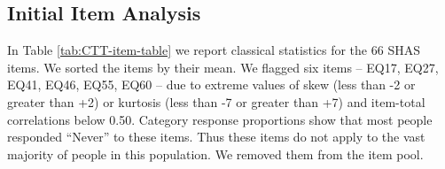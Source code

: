 \documentclass[
]{article}
\begin{document}
\hypertarget{initial-item-analysis}{%
\subsection{Initial Item Analysis}\label{initial-item-analysis}}

In Table \ref{tab:CTT-item-table} we report classical statistics for the 66 SHAS items. We sorted the items by their mean. We flagged six items -- EQ17, EQ27, EQ41, EQ46, EQ55, EQ60 -- due to extreme values of skew (less than -2 or greater than +2) or kurtosis (less than -7 or greater than +7) and item-total correlations below 0.50. Category response proportions show that most people responded ``Never'' to these items. Thus these items do not apply to the vast majority of people in this population. We removed them from the item pool.

\begingroup\fontsize{7}{9}\selectfont
\end{document}
